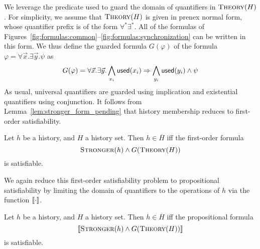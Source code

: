We leverage the predicate {\sf used} to guard the domain of quantifiers in
$\textsc{Theory}(H)$. For simplicity, we assume that $\textsc{Theory}(H)$ is
given in prenex normal form, whose quantifier prefix is of the form $\forall^*
\exists^*$. All of the formulas of
Figures~\ref{fig:formulas:common}--\ref{fig:formulas:synchronization} can be
written in this form. We thus define the guarded formula $G(\varphi)$ of the formula
$\varphi = \forall \vec{x}. \exists \vec{y}. \psi$ as
\begin{align*}
  G(\varphi) = \forall \vec{x}. \exists \vec{y}.
  \bigwedge_{x_i} {\sf used}(x_i) \implies 
  \bigwedge_{y_i} {\sf used}(y_i) \land \psi
\end{align*}
As usual, universal quantifiers are guarded using implication and existential
quantifiers using conjunction. It follows from
Lemma~\ref{lem:stronger_form_pending} that history membership reduces to
first-order satisfiability.

\begin{theorem}
  \label{th:satisfiability_complete}

  Let $h$ be a history, and $H$ a history set. Then $h \in \overline{H}$ if{f}
  the first-order formula
  $$\textsc{Stronger}(h) \land G(\textsc{Theory}(H))$$
  is satisfiable.

\end{theorem}

We again reduce this first-order satisfiability problem to propositional
satisfiability by limiting the domain of quantifiers to the operations of $h$
via the function $\db{\cdot}$.

\begin{corollary}
  \label{cor:satisfiability_pending}

  Let $h$ be a history, and $H$ a history set. Then $h \in \overline{H}$ if{f}
  the propositional formula
  $$\db{\textsc{Stronger}(h) \land G(\textsc{Theory}(H))}$$
  is satisfiable.

\end{corollary}
